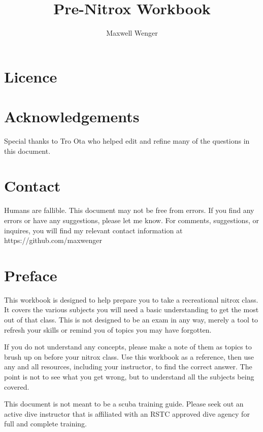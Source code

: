 \documentclass[12pt,letter]{exam}
\title{Pre-Nitrox Workbook}
\author{Maxwell Wenger}
\def\frontmatter{%
    \pagenumbering{roman}
    \setcounter{page}{1}
    \renewcommand{\thesection}{\Roman{section}}
}%
\def\mainmatter{%
    \pagenumbering{arabic}
    \setcounter{page}{1}
    \setcounter{section}{0}
    \renewcommand{\thesection}{\arabic{section}}
}%
\begin{document}
\maketitle

\frontmatter
\section{Licence}
\doclicenseThis

\section{Acknowledgements}
Special thanks to Tro Ota who helped edit and refine many of the questions in this document.

\section{Contact}
Humans are fallible. This document may not be free from errors. If you find any errors or have any suggestions, please let me know.
For comments, suggestions, or inquires, you will find my relevant contact information at https://github.com/maxwenger

\section{Preface}
This workbook is designed to help prepare you to take a recreational nitrox class. It covers the various subjects you will need a basic understanding to get the most out of that class. This is not designed to be an exam in any way, merely a tool to refresh your skills or remind you of topics you may have forgotten.

If you do not understand any concepts, please make a note of them as topics to brush up on before your nitrox class. Use this workbook as a reference, then use any and all resources, including your instructor, to find the correct answer. The point is not to see what you get wrong, but to understand all the subjects being covered.

This document is not meant to be a scuba training guide. Please seek out an active dive instructor that is affiliated with an RSTC approved dive agency for full and complete training.

\pagebreak

\mainmatter
\end{document}
